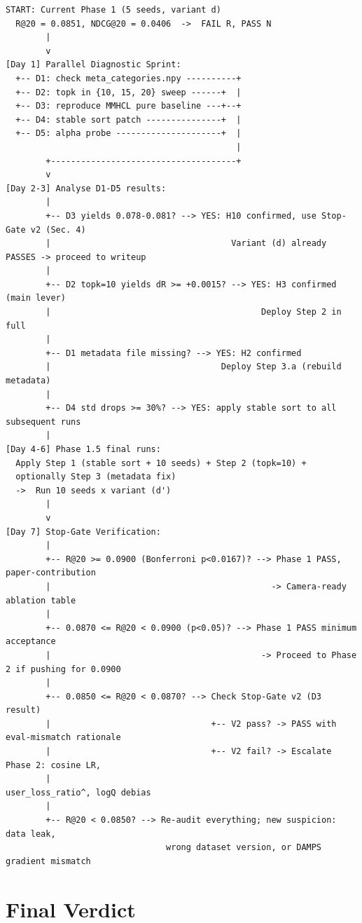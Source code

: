 \documentclass[11pt,a4paper]{article}
\begin{document}
\begin{lstlisting}[basicstyle=\ttfamily\scriptsize,backgroundcolor=\color{backcolour},breaklines=true,frame=single]
START: Current Phase 1 (5 seeds, variant d)
  R@20 = 0.0851, NDCG@20 = 0.0406  ->  FAIL R, PASS N
        |
        v
[Day 1] Parallel Diagnostic Sprint:
  +-- D1: check meta_categories.npy ----------+
  +-- D2: topk in {10, 15, 20} sweep ------+  |
  +-- D3: reproduce MMHCL pure baseline ---+--+
  +-- D4: stable sort patch ---------------+  |
  +-- D5: alpha probe ---------------------+  |
                                              |
        +-------------------------------------+
        v
[Day 2-3] Analyse D1-D5 results:
        |
        +-- D3 yields 0.078-0.081? --> YES: H10 confirmed, use Stop-Gate v2 (Sec. 4)
        |                                    Variant (d) already PASSES -> proceed to writeup
        |
        +-- D2 topk=10 yields dR >= +0.0015? --> YES: H3 confirmed (main lever)
        |                                          Deploy Step 2 in full
        |
        +-- D1 metadata file missing? --> YES: H2 confirmed
        |                                  Deploy Step 3.a (rebuild metadata)
        |
        +-- D4 std drops >= 30%? --> YES: apply stable sort to all subsequent runs
        |
[Day 4-6] Phase 1.5 final runs:
  Apply Step 1 (stable sort + 10 seeds) + Step 2 (topk=10) +
  optionally Step 3 (metadata fix)
  ->  Run 10 seeds x variant (d')
        |
        v
[Day 7] Stop-Gate Verification:
        |
        +-- R@20 >= 0.0900 (Bonferroni p<0.0167)? --> Phase 1 PASS, paper-contribution
        |                                            -> Camera-ready ablation table
        |
        +-- 0.0870 <= R@20 < 0.0900 (p<0.05)? --> Phase 1 PASS minimum acceptance
        |                                          -> Proceed to Phase 2 if pushing for 0.0900
        |
        +-- 0.0850 <= R@20 < 0.0870? --> Check Stop-Gate v2 (D3 result)
        |                                +-- V2 pass? -> PASS with eval-mismatch rationale
        |                                +-- V2 fail? -> Escalate Phase 2: cosine LR,
        |                                                user_loss_ratio^, logQ debias
        |
        +-- R@20 < 0.0850? --> Re-audit everything; new suspicion: data leak,
                                wrong dataset version, or DAMPS gradient mismatch
\end{lstlisting}

\section{Final Verdict}
\end{document}
